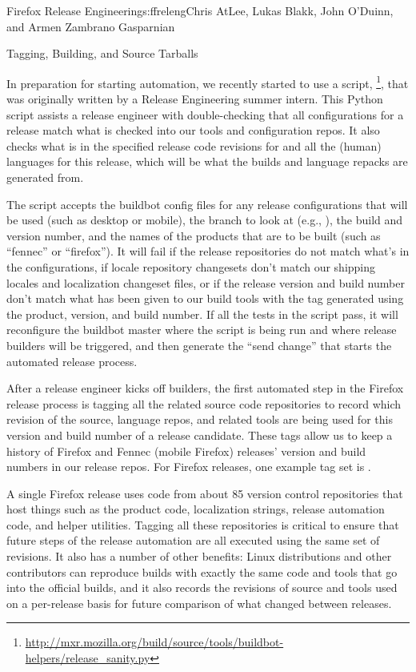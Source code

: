 \begin{aosachapter}{Firefox Release Engineering}{s:ffreleng}{Chris AtLee, Lukas Blakk, John O'Duinn, and Armen Zambrano Gasparnian}
\begin{aosasect1}{Tagging, Building, and Source Tarballs}

    
In preparation for starting automation, we recently started to use a
script,
\footnote{\url{http://mxr.mozilla.org/build/source/tools/buildbot-helpers/release_sanity.py}},
that was originally written by a Release Engineering summer intern. This
Python script assists a release engineer with double-checking that all
configurations for a release match what is checked into our tools and
configuration repos.  It also checks what is in the specified release
code revisions for  and all the (human)
languages for this release, which will be what the builds and language
repacks are generated from.

The script accepts the buildbot config files for any release configurations
that will be used (such as desktop or mobile), the branch to look at (e.g.,
), the build and version number, and the names of the
products that are to be built (such as ``fennec'' or ``firefox''). It will fail if
the release repositories do not
match what's in the configurations, if locale repository changesets don't
match our shipping locales and localization changeset files, or if the
release version and build number don't match what has been given to
our build tools with the tag generated using the product,
version, and build number. If all
the tests in the script pass, it will reconfigure the
buildbot master where the script is being run and where release
builders will be triggered, and then generate the ``send change'' that
starts the automated release process.

After a release engineer kicks off builders,
the first automated step in the Firefox release process is tagging all
the related source code repositories to record which revision of
the source, language repos, and related tools are being used for this
version and build number of a release candidate. 
These tags allow us
to keep a history of Firefox and Fennec (mobile Firefox) releases'
version and build numbers in our release repos.
For Firefox releases, one example tag set is
.  

A single Firefox
release uses code from about 85 version control repositories that host
things such as the product code, localization strings, release
automation code, and helper utilities. Tagging all these repositories
is critical to ensure that future steps of the release
automation are all executed using the same set of revisions. It also has a
number of other benefits: Linux distributions and other contributors
can reproduce builds with exactly the same code and tools that go into the
official builds, and it also records the revisions of source and tools
used on a per-release basis for future comparison of what changed
between releases. 
    

\end{aosasect1}
\end{aosachapter}

